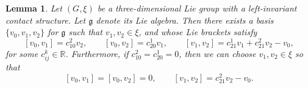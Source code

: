 \documentclass[reqno]{amsart}
\newtheorem{lemma}[theorem]{Lemma}
\theoremstyle{remark}
\theoremstyle{plain}
\begin{document}
\begin{lemma}\label{lem:can_frame}
    Let $(G,\xi)$ be a three-dimensional Lie group with a left-invariant contact structure. Let $\mathfrak g$ denote its Lie algebra. Then there exists a basis $\{v_0,v_1,v_2\}$ for $\mathfrak g$ such that $v_1,v_2\in\xi$, and whose Lie brackets satisfy
    \begin{equation}\label{eq:can_frame}
[v_0,v_1]=c_{10}^2v_2,\qquad 
[v_0,v_2]=c_{20}^1v_1,\qquad
[v_1,v_2]=c_{21}^1v_1+c_{21}^2v_2-v_0,
\end{equation}
for some $c_{ij}^k\in \mathbb R$. Furthermore, if $c_{10}^2=c_{20}^1=0$, then we can choose $v_1,v_2\in\xi$ so that 
\begin{equation}\label{eq:heis_cns}
    [v_0,v_1]=[v_0,v_2]=0,\qquad [v_1,v_2]=c_{21}^2v_2-v_0.
\end{equation}
\end{lemma}
\end{document}
